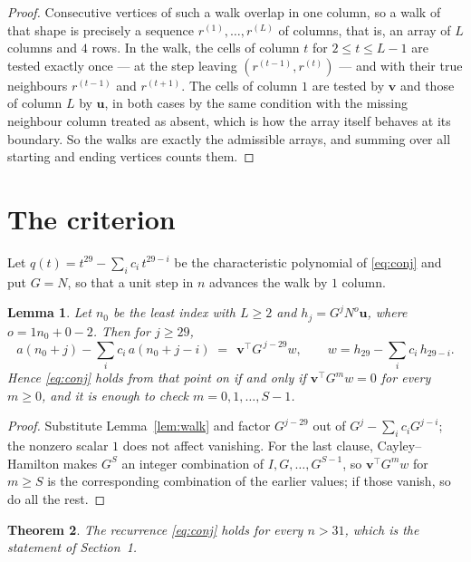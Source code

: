 \documentclass[11pt,a4paper]{article}
\theoremstyle{plain}
\newtheorem{theorem}{Theorem}
\newtheorem{lemma}[theorem]{Lemma}
\theoremstyle{definition}
\begin{document}
\begin{proof}
Consecutive vertices of such a walk overlap in one column, so a walk of that shape is
precisely a sequence $r^{(1)},\dots,r^{(L)}$ of columns, that is, an array of $L$ columns
and $4$ rows. In the walk, the cells of column $t$ for $2\le t\le L-1$ are tested
exactly once --- at the step leaving $(r^{(t-1)},r^{(t)})$ --- and with their true
neighbours $r^{(t-1)}$ and $r^{(t+1)}$. The cells of column $1$ are tested by
$\mathbf{v}$ and those of column $L$ by $\mathbf{u}$, in both cases by the same condition
with the missing neighbour column treated as absent, which is how the array itself behaves at
its boundary. So the walks are exactly the admissible arrays, and summing over all starting
and ending vertices counts them.
\end{proof}

\section{The criterion}

Let $q(t)=t^{29}-\sum_i c_i\,t^{29-i}$ be the characteristic polynomial of
\eqref{eq:conj} and put $G=N$, so that a unit step in $n$ advances the walk by
$1$ column.

\begin{lemma}\label{lem:crit}
Let $n_0$ be the least index with $L\ge2$ and $h_j=G^{j}N^{o}\mathbf{u}$, where
$o=1n_0+0-2$. Then for $j\ge29$,
\[
a(n_0+j)-\sum_i c_i\,a(n_0+j-i)\;=\;\,\mathbf{v}^{\!\top}G^{\,j-29}w,
\qquad w=h_{29}-\sum_i c_i\,h_{29-i} .
\]
Hence \eqref{eq:conj} holds from that point on if and only if
$\mathbf{v}^{\!\top}G^{m}w=0$ for every $m\ge0$, and it is enough to check
$m=0,1,\dots,S-1$.
\end{lemma}

\begin{proof}
Substitute Lemma~\ref{lem:walk} and factor $G^{j-29}$ out of
$G^{j}-\sum_ic_iG^{j-i}$; the nonzero scalar $1$ does not affect
vanishing. For the last clause, Cayley--Hamilton makes $G^{S}$ an integer combination of
$I,G,\dots,G^{S-1}$, so $\mathbf{v}^{\!\top}G^{m}w$ for $m\ge S$ is the corresponding
combination of the earlier values; if those vanish, so do all the rest.
\end{proof}

\begin{theorem}
The recurrence \eqref{eq:conj} holds for every $n>31$, which is the statement of
Section~1.
\end{theorem}
\end{document}
